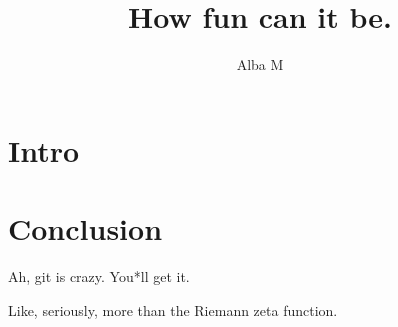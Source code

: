 \documentclass{article}
\author{Alba M}
\title{How fun can it be.}
\begin{document}
	\maketitle
	\section{Intro}
	\section{Conclusion}
	Ah, git is crazy. You*ll get it.
	
	Like, seriously, more than the Riemann zeta function.
\end{document}
